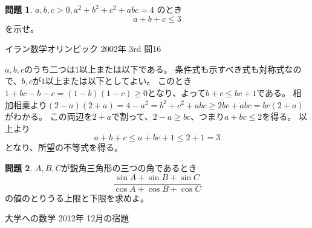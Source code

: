 \documentclass[uplatex, a5paper]{jsarticle}
\makeatletter
\theoremstyle{definition}
\newtheorem{prob}{問題}
\renewenvironment{proof}[1][\proofname]{
  \pushQED{\qed}%
  \normalfont \topsep6\p@\@plus6\p@\relax
  \trivlist
  \item[\hskip\labelsep
    #1\@addpunct{\textbf{.}}]\ignorespaces
}{%
  \popQED\endtrivlist\@endpefalse
}
\providecommand{\proofname}{証明}
\def\qed{\hfill $\Box$}
\makeatother
\begin{document}
\newpage

\begin{prob}
  \(a , b , c > 0 , a^2 + b^2 + c^2 + abc = 4\)
  のとき
  \[
  a+b+c \leq 3
  \]
  を示せ。
  \begin{flushright}
    イラン数学オリンピック 2002年 3rd 問16
  \end{flushright}
\end{prob}


\begin{proof}
  \(a,b,c\)のうち二つは\(1\)以上または以下である。
  条件式も示すべき式も対称式なので、\(b,c\)が\(1\)以上または以下としてよい。
  このとき\(1+bc-b-c = (1-b)(1-c) \geq 0\)となり、よって\(b+c \leq bc+1\)である。
  相加相乗より\((2-a)(2+a) = 4-a^2 = b^2+c^2+abc \geq 2bc + abc =bc(2+a)\)がわかる。
  この両辺を\(2+a\)で割って、\(2-a \geq bc\)、つまり\(a+bc \leq 2\)を得る。
  以上より
  \[
  a+b+c \leq a +bc +1 \leq 2+1 =3
  \]
  となり、所望の不等式を得る。
\end{proof}












\newpage

\begin{prob}
  \(A,B,C\)が鋭角三角形の三つの角であるとき
  \[
  \frac{\sin A + \sin B + \sin C }{\cos A + \cos B + \cos C }
  \]
  の値のとりうる上限と下限を求めよ。
  \begin{flushright}
    大学への数学 2012年 12月の宿題
  \end{flushright}
\end{prob}
\end{document}
